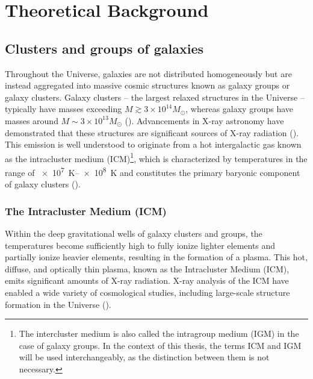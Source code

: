 
\chapter{Theoretical Background}
\label{sec:theoretical_background}
\section{Clusters and groups of galaxies}\label{sec:clusters}
Throughout the Universe, galaxies are not distributed homogeneously but are instead aggregated into massive cosmic structures known as galaxy groups or galaxy clusters. Galaxy clusters -- the largest relaxed structures in the Universe -- typically have masses exceeding \(M \gtrsim 3 \times 10^{14} M_{\odot}\), whereas galaxy groups have masses around \(M \sim 3 \times 10^{13} M_{\odot}\) (\cite{Schneider_2006}). Advancements in X-ray astronomy have demonstrated that these structures are significant sources of X-ray radiation (\cite{Cavaliere_1971}). This emission is well understood to originate from a hot intergalactic gas known as the intracluster medium (ICM)\footnote{The intercluster medium is also called the intragroup medium (IGM) in the case of galaxy groups. In the context of this thesis, the terms ICM and IGM will be used interchangeably, as the distinction between them is not necessary.}, which is characterized by temperatures in the range of \SIrange{e7}{e8}{\kelvin} and constitutes the primary baryonic component of galaxy clusters (\cite{Schneider_2006}).
%
\subsection{The Intracluster Medium (ICM)}
Within the deep gravitational wells of galaxy clusters and groups, the temperatures become sufficiently high to fully ionize lighter elements and partially ionize heavier elements, resulting in the formation of a plasma. This hot, diffuse, and optically thin plasma, known as the Intracluster Medium (ICM), emits significant amounts of X-ray radiation. X-ray analysis of the ICM have enabled a wide variety of cosmological studies, including large-scale structure formation in the Universe (\cite{KravtsovBorgani2012}).
%
